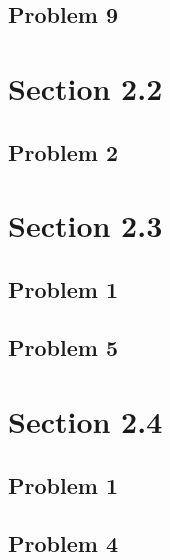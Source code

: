 \documentclass{article}
\begin{document}
  \subsection{Problem 9}
\section{Section 2.2}
  \subsection{Problem 2}
\section{Section 2.3}
  \subsection{Problem 1}
  \subsection{Problem 5}
\section{Section 2.4}
  \subsection{Problem 1}
  \subsection{Problem 4}
\end{document}
